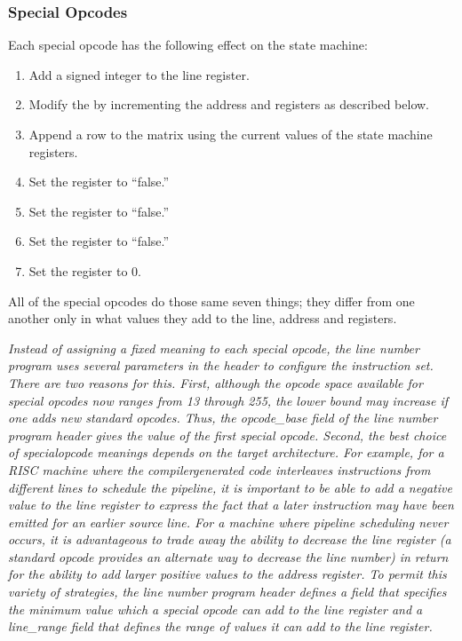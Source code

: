 \subsubsection{Special Opcodes} 
\label{chap:specialopcodes}
Each  special opcode has the following effect on the state machine:

\begin{enumerate}[1. ]

\item  Add a signed integer to the line register.

\item  Modify the  by incrementing the
address and  registers as described below.

\item  Append a row to the matrix using the current values
of the state machine registers.

\item  Set the  register to ``false.'' 
\item  Set the  register to ``false.''
\item  Set the  register to ``false.''
\item  Set the  register to 0.

\end{enumerate}

All of the special opcodes do those same seven things; they
differ from one another only in what values they add to the
line, address and  registers.


\textit{Instead of assigning a fixed meaning to each special opcode,
the line number program uses several parameters in the header
to configure the instruction set. There are two reasons
for this.  First, although the opcode space available for
special opcodes now ranges from 13 through 255, the lower
bound may increase if one adds new standard opcodes. Thus, the
opcode\_base field of the line number program header gives the
value of the first special opcode. Second, the best choice of
special\dash opcode meanings depends on the target architecture. For
example, for a RISC machine where the compiler\dash generated code
interleaves instructions from different lines to schedule
the pipeline, it is important to be able to add a negative
value to the line register to express the fact that a later
instruction may have been emitted for an earlier source
line. For a machine where pipeline scheduling never occurs,
it is advantageous to trade away the ability to decrease
the line register (a standard opcode provides an alternate
way to decrease the line number) in return for the ability
to add larger positive values to the address register. To
permit this variety of strategies, the line number program
header defines a 
field that specifies the minimum
value which a special opcode can add to the line register
and a line\_range field that defines the range of values it
can add to the line register.}


